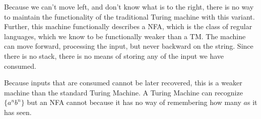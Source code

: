 \begin{problem}{7}
  \begin{solution}
    Because we can't move left, and don't know what is to the right, there is no way to maintain the functionality of
    the traditional Turing machine with this variant.  Further, this machine functionally describes a NFA, which is the
    class of regular languages, which we know to be functionally weaker than a TM. The machine can move forward,
    processing the input, but never backward on the string. Since there is no stack, there is no means of storing any of
    the input we have consumed.

    Because inputs that are consumed cannot be later recovered, this is a weaker machine than the standard Turing
    Machine.  A Turing Machine can recognize $\{ a^nb^n \}$ but an NFA cannot because it has no way of remembering how
    many $a$s it has seen.
  \end{solution}
\end{problem}

